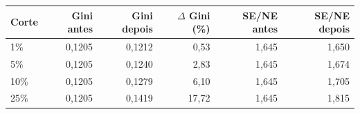 \begin{tabular}{lrrrrr}
\toprule
Corte & Gini antes & Gini depois & $\Delta$ Gini (\%) & SE/NE antes & SE/NE depois \\
\midrule
1\% & 0,1205 & 0,1212 & 0,53 & 1,645 & 1,650 \\
5\% & 0,1205 & 0,1240 & 2,83 & 1,645 & 1,674 \\
10\% & 0,1205 & 0,1279 & 6,10 & 1,645 & 1,705 \\
25\% & 0,1205 & 0,1419 & 17,72 & 1,645 & 1,815 \\
\bottomrule
\end{tabular}
